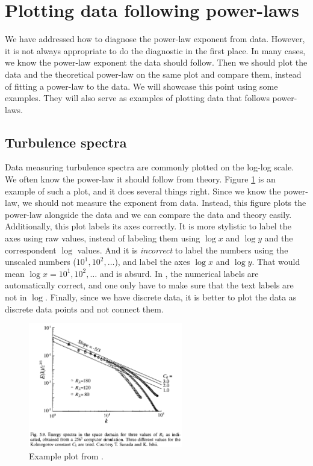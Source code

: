 \documentclass[11pt,letterpaper]{article}
\begin{document}
\section{Plotting data following power-laws}\label{sec_plot_log}
We have addressed how to diagnose the power-law exponent from data. However, it is not always appropriate to do the diagnostic in the first place. In many cases, we know the power-law exponent the data should follow. Then we should plot the data and the theoretical power-law on the same plot and compare them, instead of fitting a power-law to the data. We will showcase this point using some examples. They will also serve as examples of plotting data that follows power-laws.

\subsection{Turbulence spectra}
Data measuring turbulence spectra are commonly plotted on the log-log scale. We often know the power-law it should follow from theory. Figure \ref{fig_turb_spec_eg} is an example of such a plot, and it does several things right. Since we know the power-law, we should not measure the exponent from data. Instead, this figure plots the power-law alongside the data and we can compare the data and theory easily. Additionally, this plot labels its axes correctly. It is more stylistic to label the axes using raw values, instead of labeling them using $\log x$ and $\log y$ and the correspondent $\log$ values. And it is \textit{incorrect} to label the numbers using the unscaled numbers ($10^1, 10^2, \dots$), and label the axes $\log x$ and $\log y$. That would mean $\log x = 10^1, 10^2, \dots$ and is absurd. In \MATLAB, the numerical labels are automatically correct, and one only have to make sure that the text labels are not in $\log$. Finally, since we have discrete data, it is better to plot the data as discrete data points and not connect them.
\begin{figure}
    \centering
    \includegraphics[width = 0.6\textwidth]{figs/turb_spec_eg}
    \caption{Example plot from \cite[Fig. 5.9.]{Frisch_95}.}
    \label{fig_turb_spec_eg}
\end{figure}
\end{document}
